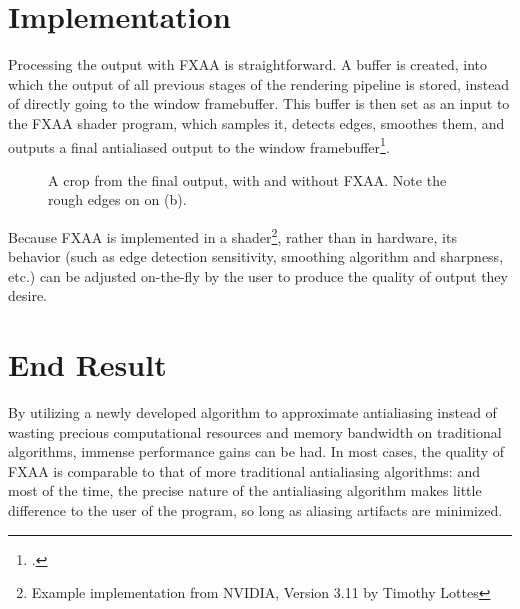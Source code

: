 \documentclass[11pt, oneside]{report}
\begin{document}
\section{Implementation}
Processing the output with \gls{FXAA} is straightforward. A buffer is created, into which the output of all previous stages of the rendering pipeline is stored, instead of directly going to the window framebuffer. This buffer is then set as an input to the \gls{FXAA} \gls{shader} program, which samples it, detects edges, smoothes them, and outputs a final antialiased output to the window framebuffer\footcite{nvidia-fxaa}.

\begin{figure}[!htbp]
  \centering
  \hfill
  \caption{A crop from the final output, with and without FXAA. Note the rough edges on on (b).}
\end{figure}

Because \gls{FXAA} is implemented in a shader\footnote{Example implementation from NVIDIA, Version 3.11 by Timothy Lottes}, rather than in hardware, its behavior (such as edge detection sensitivity, smoothing algorithm and sharpness, etc.) can be adjusted on-the-fly by the user to produce the quality of output they desire.

\section{End Result}
By utilizing a newly developed algorithm to approximate antialiasing instead of wasting precious computational resources and \gls{memory bandwidth} on traditional algorithms, immense performance gains can be had. In most cases, the quality of \gls{FXAA} is comparable to that of more traditional antialiasing algorithms: and most of the time, the precise nature of the antialiasing algorithm makes little difference to the user of the program, so long as \gls{aliasing} artifacts are minimized.
\end{document}
